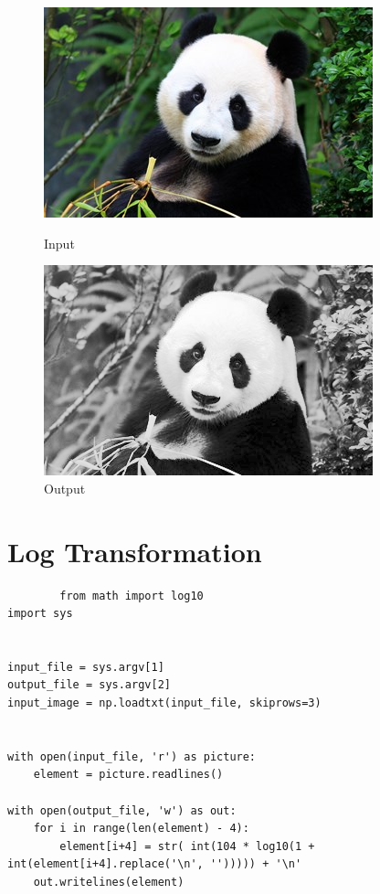 \documentclass[a4paper,8pt]{article}
\begin{document}
        \begin{figure}[H]
        \centering
        \begin{minipage}{0.4\linewidth}
        \centering
        \includegraphics[width=\linewidth]{output/input1.jpg}
        \caption{Input}
        \end{minipage}
        \hfill
        \begin{minipage}{0.4\linewidth}
        \centering
        \includegraphics[width=\linewidth]{output/Histogram Equalization_output.png}
        \caption{Output}
        \end{minipage}
        \end{figure}
        \clearpage
        
        \section{Log Transformation}
        \begin{verbatim}
        from math import log10
import sys


input_file = sys.argv[1]
output_file = sys.argv[2]
input_image = np.loadtxt(input_file, skiprows=3)


with open(input_file, 'r') as picture:
    element = picture.readlines()

with open(output_file, 'w') as out:
    for i in range(len(element) - 4):
        element[i+4] = str( int(104 * log10(1 + int(element[i+4].replace('\n', ''))))) + '\n'
    out.writelines(element)

        \end{verbatim}
        
\end{document}
